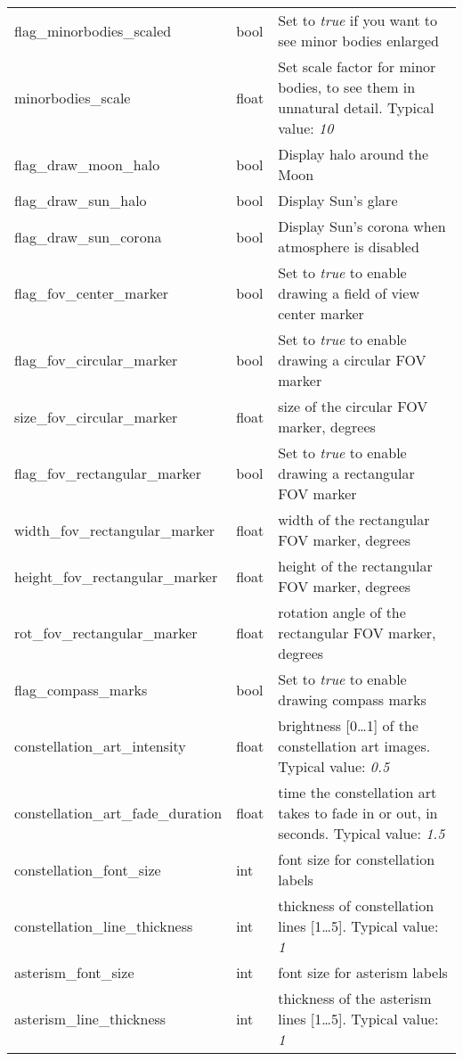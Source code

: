 \begin{longtable}{l|l|p{77mm}}
flag\_minorbodies\_scaled     & bool & Set to \emph{true} if you want to see minor bodies enlarged \\
minorbodies\_scale            & float & Set scale factor for minor bodies, to see them in unnatural detail. Typical value: \emph{10}\\
\midrule
flag\_draw\_moon\_halo           & bool  & Display halo around the Moon\\
flag\_draw\_sun\_halo            & bool  & Display Sun's glare\\
flag\_draw\_sun\_corona          & bool  & Display Sun's corona when atmosphere is disabled\\
\midrule
flag\_fov\_center\_marker        & bool  & Set to \emph{true} to enable drawing a field of view center marker \\
flag\_fov\_circular\_marker      & bool  & Set to \emph{true} to enable drawing a circular FOV marker \\
size\_fov\_circular\_marker      & float & size of the circular FOV marker, degrees \\
flag\_fov\_rectangular\_marker   & bool  & Set to \emph{true} to enable drawing a rectangular FOV marker \\
width\_fov\_rectangular\_marker  & float & width of the rectangular FOV marker, degrees \\
height\_fov\_rectangular\_marker & float & height of the rectangular FOV marker, degrees \\
rot\_fov\_rectangular\_marker    & float & rotation angle of the rectangular FOV marker, degrees \\
flag\_compass\_marks             & bool  & Set to \emph{true} to enable drawing compass marks \\
\midrule
constellation\_art\_intensity      & float & brightness [0\ldots1] of the constellation art images. Typical value: \emph{0.5}\\%
constellation\_art\_fade\_duration & float & time the constellation art takes to fade in or out, in seconds. Typical value: \emph{1.5}\\%
constellation\_font\_size          & int   & font size for constellation labels\\%
constellation\_line\_thickness     & int   & thickness of constellation lines [1\ldots5]. Typical value: \emph{1}\\%
asterism\_font\_size               & int   & font size for asterism labels\\%
asterism\_line\_thickness          & int   & thickness of the asterism lines [1\ldots5]. Typical value: \emph{1}\\%

\end{longtable}
